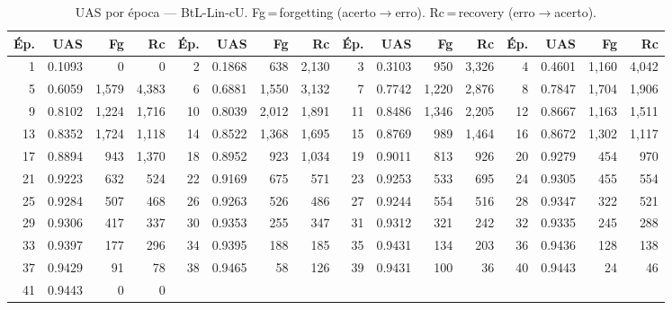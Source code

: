 \begin{table}[ht]
\centering\scriptsize
\caption{UAS por época --- BtL-Lin-cU. Fg\,=\,forgetting (acerto$\to$erro). Rc\,=\,recovery (erro$\to$acerto).}
\label{tab:uas-predictions-results-bertimbau-large-linear}
\begin{tabular}{rrrr rrrr rrrr rrrr}
\toprule
\textbf{Ép.} & \textbf{UAS} & \textbf{Fg} & \textbf{Rc} & \textbf{Ép.} & \textbf{UAS} & \textbf{Fg} & \textbf{Rc} & \textbf{Ép.} & \textbf{UAS} & \textbf{Fg} & \textbf{Rc} & \textbf{Ép.} & \textbf{UAS} & \textbf{Fg} & \textbf{Rc} \\
\midrule
1 & 0.1093 & 0 & 0 & 2 & 0.1868 & 638 & 2,130 & 3 & 0.3103 & 950 & 3,326 & 4 & 0.4601 & 1,160 & 4,042 \\
5 & 0.6059 & 1,579 & 4,383 & 6 & 0.6881 & 1,550 & 3,132 & 7 & 0.7742 & 1,220 & 2,876 & 8 & 0.7847 & 1,704 & 1,906 \\
9 & 0.8102 & 1,224 & 1,716 & 10 & 0.8039 & 2,012 & 1,891 & 11 & 0.8486 & 1,346 & 2,205 & 12 & 0.8667 & 1,163 & 1,511 \\
13 & 0.8352 & 1,724 & 1,118 & 14 & 0.8522 & 1,368 & 1,695 & 15 & 0.8769 & 989 & 1,464 & 16 & 0.8672 & 1,302 & 1,117 \\
17 & 0.8894 & 943 & 1,370 & 18 & 0.8952 & 923 & 1,034 & 19 & 0.9011 & 813 & 926 & 20 & 0.9279 & 454 & 970 \\
21 & 0.9223 & 632 & 524 & 22 & 0.9169 & 675 & 571 & 23 & 0.9253 & 533 & 695 & 24 & 0.9305 & 455 & 554 \\
25 & 0.9284 & 507 & 468 & 26 & 0.9263 & 526 & 486 & 27 & 0.9244 & 554 & 516 & 28 & 0.9347 & 322 & 521 \\
29 & 0.9306 & 417 & 337 & 30 & 0.9353 & 255 & 347 & 31 & 0.9312 & 321 & 242 & 32 & 0.9335 & 245 & 288 \\
33 & 0.9397 & 177 & 296 & 34 & 0.9395 & 188 & 185 & 35 & 0.9431 & 134 & 203 & 36 & 0.9436 & 128 & 138 \\
37 & 0.9429 & 91 & 78 & 38 & 0.9465 & 58 & 126 & 39 & 0.9431 & 100 & 36 & 40 & 0.9443 & 24 & 46 \\
41 & 0.9443 & 0 & 0 &  & & &  &  & & &  &  & & &  \\
\bottomrule
\end{tabular}
\end{table}
